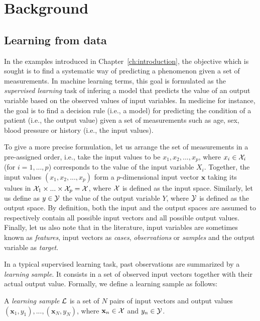 \chapter{Background}\label{ch:background}

\section{Learning from data}

In the examples introduced in Chapter~\ref{ch:introduction}, the objective
which is sought is to find a systematic way of predicting a phenomenon given a
set of measurements. In machine learning terms, this goal is formulated as the
{\it supervised learning} task of infering a model that predicts the value of
an output variable based on the observed values of input variables. In
medicine for instance, the goal is to find a decision rule (i.e., a model) for
predicting the condition of a patient (i.e., the output value) given a set of
measurements such as age, sex, blood pressure or history (i.e., the input
values).

To give a more precise formulation, let us arrange the set of measurements in a
pre-assigned order, i.e., take the input values to be $x_1, x_2, ..., x_p$,
where $x_i \in {\cal X}_i$ (for $i = 1, ..., p$) corresponds to the value of
the input variable $X_i$. Together, the input values $(x_1, x_2, ..., x_p)$
form a $p$-dimensional input vector $\mathbf{x}$ taking its values in ${\cal
X}_1 \times ... \times {\cal X}_p = {\cal X}$, where ${\cal X}$ is defined as
the input space. Similarly, let us define as $y \in {\cal Y}$ the value of the
output variable $Y$, where ${\cal Y}$ is defined as the output space. By
definition, both the input and the output spaces are assumed to respectively
contain all possible input vectors and all possible output values. Finally, let us also
note that in the literature, input variables are sometimes known as {\it features},
input vectors as {\it cases}, {\it observations} or {\it samples} and the
output variable as {\it target}.

In a typical supervised learning task, past observations are summarized by a
{\it learning sample}. It consists in a set of observed input
vectors together with their actual output value. Formally, we define a learning
sample as follows:

\begin{definition}
A \emph{learning sample} ${\cal L}$ is a set of $N$
pairs of input vectors and output values $(\mathbf{x}_1, y_1), ...,
(\mathbf{x}_N, y_N)$, where $\mathbf{x}_n \in {\cal X}$ and $y_n \in {\cal Y}$.
\end{definition}


